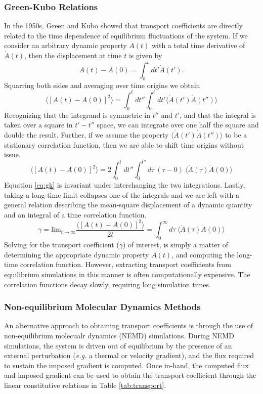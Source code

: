 \subsubsection{Green-Kubo Relations}
In the 1950s, Green and Kubo showed that transport coefficients are
directly related to the time dependence of equilibrium fluctuations of
the system.\cite{Green1954,Kubo1957} If we consider an arbitrary
dynamic property $A(t)$ with a total time derivative of $\dot{A}(t)$,
then the displacement at time $t$ is given by
\begin{equation}
A(t) - A(0) = \int_0^t dt' \dot{A}(t').
\end{equation}
Squarring both sides and averaging over time origins we obtain 
\begin{equation}
\langle [A(t) - A(0)]^2 \rangle = \int_0^t dt'' \int_0^t dt' \langle
\dot{A}(t') \dot{A}(t'') \rangle
\end{equation}
Recognizing that the integrand is symmetric in $t''$ and $t'$, and
that the integral is taken over a square in $t'-t''$ space, we can
integrate over one half the square and double the result. Further, if
we assume the property $\langle \dot{A}(t') \dot{A}(t'') \rangle$ to
be a stationary correlation function, then we are able to shift time
origins without issue. 
\begin{equation}\label{eq:gk}
  \langle [A(t) - A(0)]^2 \rangle = 2 \int_0^t dt'' \int_0^{t''} d\tau ~
  (\tau-0)~\langle \dot{A}(\tau ) \dot{A}(0) \rangle
\end{equation}
Equation \ref{eq:gk} is invariant under interchanging the two
integrations. Lastly, taking a long-time limit collapses one of the
integrals and we are left with a general relation describing the
mean-square displacement of a dynamic quantity and an integral of a
time correlation function.
\begin{equation}\label{eq:gk2}
 \gamma =  \mathrm{lim}_{t \rightarrow \infty} \frac{\langle[ A(t) - A(0)]^2 \rangle}{2t} =
  \int_0^{\infty} d\tau ~ \langle \dot{A}(\tau ) \dot{A}(0) \rangle
\end{equation}
Solving for the transport coefficient ($\gamma$) of interest, is
simply a matter of determining the appropriate dynamic property
$A(t)$, and computing the long-time correlation function. However,
extracting transport coefficients from equilibrium simulations in this
manner is often computationally expensive. The correlation functions
decay slowly, requiring long simulation times.

\subsubsection{Non-equilibrium Molecular Dynamics Methods}
An alternative approach to obtaining transport coefficients is through
the use of non-equilibrium molecualr dynamics (NEMD) simulations.
During NEMD simulations, the system is driven out of equilibrium by
the presence of an external perturbation (\textit{e.g.} a thermal or
velocity gradient), and the flux required to sustain the imposed
gradient is computed. Once in-hand, the computed flux and imposed
gradient can be used to obtain the transport coefficient through the
linear constitutive relations in Table \ref{tab:transport}.

